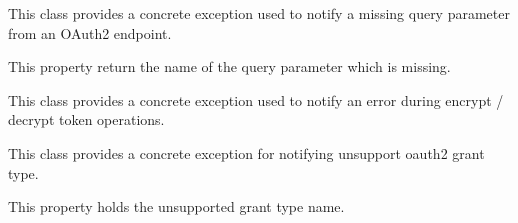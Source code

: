 \documentclass[letterpaper,10pt,english]{sphinxmanual}
\begin{document}

\begin{fulllineitems}
\label{features/oauth2/technical_summary:fantastico.oauth2.exceptions.OAuth2MissingQueryParamError}
This class provides a concrete exception used to notify a missing query parameter from an OAuth2 endpoint.

\begin{fulllineitems}
\label{features/oauth2/technical_summary:fantastico.oauth2.exceptions.OAuth2MissingQueryParamError.param_name}
This property return the name of the query parameter which is missing.

\end{fulllineitems}


\end{fulllineitems}


\begin{fulllineitems}
\label{features/oauth2/technical_summary:fantastico.oauth2.exceptions.OAuth2TokenEncryptionError}
This class provides a concrete exception used to notify an error during encrypt / decrypt token operations.

\end{fulllineitems}


\begin{fulllineitems}
\label{features/oauth2/technical_summary:fantastico.oauth2.exceptions.OAuth2UnsupportedGrantError}
This class provides a concrete exception for notifying unsupport oauth2 grant type.

\begin{fulllineitems}
\label{features/oauth2/technical_summary:fantastico.oauth2.exceptions.OAuth2UnsupportedGrantError.handler_type}
This property holds the unsupported grant type name.

\end{fulllineitems}


\end{fulllineitems}
\end{document}
